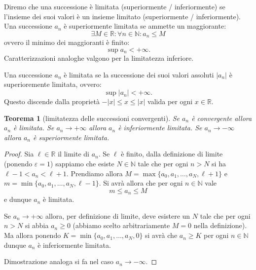 \documentclass[italian,a4paper,oneside,headinclude]{scrbook}
\newcommand{\eps}{\varepsilon}
\newcommand{\NN}{\mathbb N}
\newcommand{\RR}{\mathbb R}
\newcommand{\abs}[1]{{\left|#1\right|}}
\newtheorem{theorem}{Teorema}
\begin{document}
Diremo che una successione è limitata (superiormente / inferiormente) se
 l'insieme dei suoi valori
è un insieme limitato (superiormente / inferiormente).
Una successione $a_n$ è superiormente limitata se ammette un maggiorante:
\[
  \exists M\in \RR\colon \forall n \in \NN\colon a_n \le M
\]
ovvero il minimo dei maggioranti è finito:
\[
  \sup a_n < +\infty.
\]
Caratterizzazioni analoghe valgono per la limitatezza inferiore.

Una successione $a_n$
è limitata se la successione dei suoi valori assoluti $\abs{a_n}$ è superioremente limitata, ovvero:
\[
  \sup \abs{a_n} < +\infty.
\]
Questo discende dalla proprietà $-\abs{x} \le x \le \abs{x}$ valida
per ogni $x\in \RR$.

\begin{theorem}[limitatezza delle successioni convergenti]
Se $a_n$ è convergente allora $a_n$ è limitata.
Se $a_n\to +\infty$ allora $a_n$ è inferiormente limitata.
Se $a_n\to -\infty$ allora $a_n$ è superiormente limitata.
\end{theorem}
%
\begin{proof}
Sia $\ell \in \RR$ il limite di $a_n$.
Se $\ell$ è finito,
dalla definizione di limite (ponendo $\eps=1$) sappiamo che esiste $N\in \NN$
tale che per ogni $n> N$ si ha $\ell -1 < a_n < \ell+ 1$.
Prendiamo allora $M=\max\{a_0, a_1, \dots, a_N, \ell +1\}$
e $m =\min \{a_0, a_1, \dots, a_N, \ell-1\}$. Si avrà allora
che per ogni $n\in \NN$ vale
\[
  m \le a_n \le M
\]
e dunque $a_n$ è limitata.

Se $a_n \to +\infty$ allora, per definizione di limite, deve
esistere un $N$ tale che per ogni $n>N$ si abbia $a_n \ge 0$ (abbiamo
scelto arbitrariamente $M=0$ nella definizione). Ma allora
ponendo $K=\min\{a_0, a_1, \dots, a_N, 0\}$ si avrà che $a_n\ge K$ per ogni $n\in \NN$ dunque $a_n$ è inferiormente limitata.

Dimostrazione analoga si fa nel caso $a_n \to -\infty$.
\end{proof}
\end{document}
